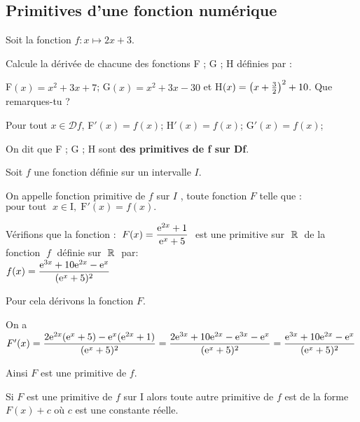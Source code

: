 


  

\subsection{Primitives d'une fonction numérique}
\begin{lemma}
Soit la fonction $ f : x \longmapsto 2x+3 $.

Calcule la dérivée de chacune des fonctions F ; G ; H définies par :

F$ (x)=x^{2} +3x+7$;  G$ (x)= x^{2} +3x-30$  et  H$ (x)=\left(x+\frac{3}{2}\right)^{2} +10$. Que remarques-tu ?
\medskip

Pour tout $ x\in \mathscr{D}f $,  F$' (x)=f(x)$;  H$' (x)=f(x)$;  G$' (x)=f(x)$;
\end{lemma}

\medskip
On dit que F ; G ; H sont  \textbf{des primitives de f sur Df}.

\begin{definition}
Soit $ f $ une fonction définie sur un intervalle $I$.

 On appelle fonction primitive de $f$ sur $I$ , toute fonction $F$ telle que :\\
$ \text{pour tout } \; x\in \text{I},\;  \text{F}'(x) = f (x).$
\end{definition}

\medskip


\begin{example}

Vérifions que la fonction : $\; F(x)=\dfrac{\mathrm{e}^{2x}+1}{\mathrm{e}^{x}+5}\; $  est une primitive sur $ \;\mathbb{R}\;  $ de la fonction $\; f\; $  définie sur $\; \mathbb{R}\; $  par: \\

 $  f(x)= \dfrac{\mathrm{e}^{3x}+10\mathrm{e}^{2x}-\mathrm{e}^{x}}{(\mathrm{e}^{x}+5)^{2}}$

\bigskip
Pour cela dérivons la fonction $F$.

\medskip
On a  $F'(x)=\dfrac{2\mathrm{e}^{2x}(\mathrm{e}^{x}+5)-\mathrm{e}^{x}(\mathrm{e}^{2x}+1)}{(\mathrm{e}^{x}+5)^{2}}  =\dfrac{2\mathrm{e}^{3x}+10\mathrm{e}^{2x}-\mathrm{e}^{3x}-\mathrm{e}^{x}}{(\mathrm{e}^{x}+5)^{2}}=\dfrac{\mathrm{e}^{3x}+10\mathrm{e}^{2x}-\mathrm{e}^{x}}{(\mathrm{e}^{x}+5)^{2}}$

Ainsi $F$ est une primitive de $ f. $
\end{example}



\begin{remark}
 Si $F$ est une primitive de $ f $ sur I alors  toute  autre primitive   de $ f $ est de la  forme $ F(x)+c $ où $ c $ est une constante réelle.
\end{remark}

